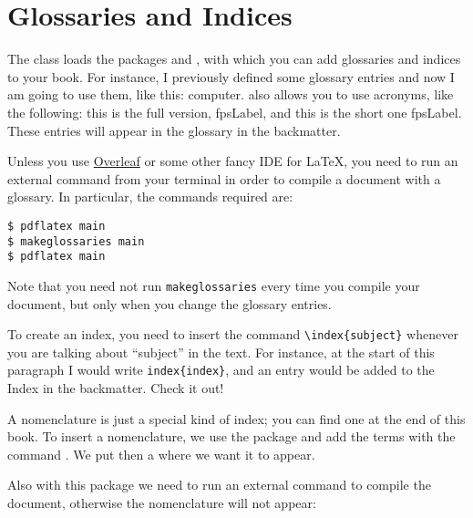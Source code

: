 \section{Glossaries and Indices}

The  class loads the packages  and 
, with which you can add glossaries and indices to 
your book. For instance, I previously defined some glossary entries and 
now I am going to use them, like this: \gls{computer}. 
 also allows you to use acronyms, like the 
following: this is the full version, \acrfull{fpsLabel}, and this is the 
short one \acrshort{fpsLabel}. These entries will appear in the glossary 
in the backmatter.

Unless you use \href{https://www.overleaf.com}{Overleaf} or some other 
fancy IDE for \LaTeX, you need to run an external command from your 
terminal in order to compile a document with a glossary. In particular, 
the commands required are:

\begin{lstlisting}[style=kaolstplain]
$ pdflatex main
$ makeglossaries main
$ pdflatex main
\end{lstlisting}

Note that you need not run \texttt{makeglossaries} every time you 
compile your document, but only when you change the glossary entries.

To create an index, you need to insert the command 
\lstinline|\index{subject}| whenever you are talking about 
\enquote{subject} in the text. For instance, at the start of this 
paragraph I would write \lstinline|index{index}|, and an entry would be 
added to the Index in the backmatter. Check it out!


A nomenclature is just a special kind of index; you can find one at the end of
this book. To insert a nomenclature, we use the package  and
add the terms with the command . We put then a
 where we want it to appear.

Also with this package we need to run an external command to compile the 
document, otherwise the nomenclature will not appear:

